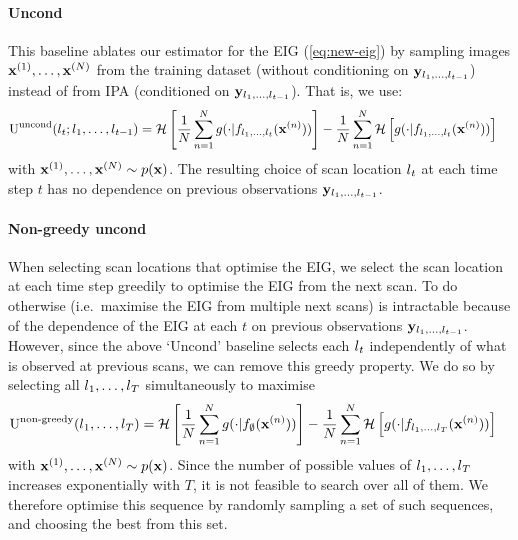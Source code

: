 \paragraph{Uncond}
This baseline ablates our estimator for the EIG (\cref{eq:new-eig}) by sampling
images ${\mathbf{x}}^{(1)},\ldots,{\mathbf{x}}^{(N)}$ from the training dataset (without
conditioning on ${\mathbf{y}}_{l{}_1,\ldots,l{}_{t-1}}$) instead of from IPA
(conditioned on ${\mathbf{y}}_{l{}_1,\ldots,l{}_{t-1}}$). That is, we use:
\begin{align}
  \label{eq:uncond}
  \text{U}^{\text{uncond}}(l{}_t; l{}_1,&\ldots,l{}_{t-1}) = \mathcal{H} \left[ \frac{1}{N} \sum_{n=1}^N g(\cdot|f_{l{}_1,\ldots,l{}_t}({\mathbf{x}}^{(n)})) \right] - \frac{1}{N} \sum_{n=1}^N  \mathcal{H} \left[ g(\cdot|f_{l{}_1,\ldots,l{}_t}({\mathbf{x}}^{(n)})) \right]
\end{align}
with ${\mathbf{x}}^{(1)},\ldots,{\mathbf{x}}^{(N)} \sim p({\mathbf{x}})$. The resulting choice of scan
location $l{}_t$ at each time step $t$ has no dependence on previous
observations ${\mathbf{y}}_{l{}_1,\ldots,l{}_{t-1}}$.

\paragraph{Non-greedy uncond}
When selecting scan locations that optimise the EIG, we select the scan location
at each time step greedily to optimise the EIG from the next scan. To do
otherwise (i.e.~maximise the EIG from multiple next scans) is intractable
because of the dependence of the EIG at each $t$ on previous observations
${\mathbf{y}}_{l{}_1,\ldots,l{}_{t-1}}$. However, since the above `Uncond' baseline
selects each $l{}_t$ independently of what is observed at previous scans, we can
remove this greedy property. We do so by selecting all $l{}_1,\ldots,l{}_T$
simultaneously to maximise
\begin{align}
  \text{U}^{\text{non-greedy}}(l{}_1,&\ldots,l{}_T) = \mathcal{H} \left[ \frac{1}{N} \sum_{n=1}^N g(\cdot|f_{\emptyset}({\mathbf{x}}^{(n)})) \right] - \frac{1}{N} \sum_{n=1}^N  \mathcal{H} \left[ g(\cdot|f_{l{}_1,\ldots,l{}_T}({\mathbf{x}}^{(n)})) \right]
\end{align}
with ${\mathbf{x}}^{(1)},\ldots,{\mathbf{x}}^{(N)} \sim p({\mathbf{x}})$. Since the number of possible
values of $l{}_1,\ldots,l{}_T$ increases exponentially with $T$, it is not feasible
to search over all of them. We therefore optimise this sequence by
randomly sampling a set of such sequences, and choosing the best from this set.



